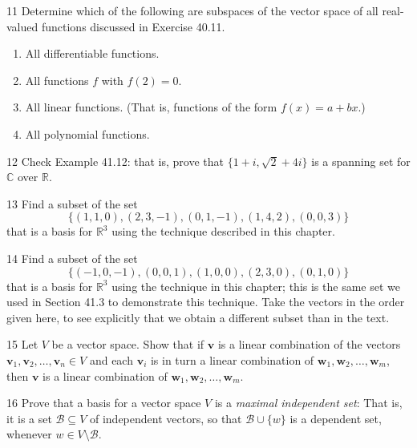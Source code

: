 \begin{problem}{11}
    Determine which of the following are subspaces of the vector space of all real-valued
    functions discussed in Exercise 40.11.
    \begin{enumerate}
        \item[(a)] All differentiable functions.
        \item[(b)] All functions $f$ with $f(2) = 0$.
        \item[(c)] All linear functions. (That is, functions of the form $f(x) = a + bx$.)
        \item[(d)] All polynomial functions.
    \end{enumerate}
\end{problem}
\unsolved

\begin{problem}{12}
    Check Example 41.12: that is, prove that $\{1 + i, \sqrt{2} + 4i\}$ is a spanning set
    for $\mathbb{C}$ over $\mathbb{R}$.
\end{problem}
\unsolved

\begin{problem}{13}
    Find a subset of the set
    \[\{(1, 1, 0), (2, 3, -1), (0, 1, -1), (1, 4, 2), (0, 0, 3)\}\]
    that is a basis for $\mathbb{R}^3$ using the technique described in this chapter.
\end{problem}
\unsolved

\begin{problem}{14}
    Find a subset of the set
    \[\{(-1, 0, -1), (0, 0, 1), (1, 0, 0), (2, 3, 0), (0, 1, 0)\}\]
    that is a basis for $\mathbb{R}^3$ using the technique in this chapter; this is the same
    set we used in Section 41.3 to demonstrate this technique. Take the vectors in the
    order given here, to see explicitly that we obtain a different subset than in the text.
\end{problem}
\unsolved

\begin{problem}{15}
    Let $V$ be a vector space. Show that if $\mathbf{v}$ is a linear combination of the
    vectors $\mathbf{v}_1, \mathbf{v}_2, \ldots, \mathbf{v}_n \in V$ and each
    $\mathbf{v}_i$ is in turn a linear combination of
    $\mathbf{w}_1, \mathbf{w}_2, \ldots, \mathbf{w}_m$, then $\mathbf{v}$ is a linear
    combination of $\mathbf{w}_1, \mathbf{w}_2, \ldots, \mathbf{w}_m$.
\end{problem}
\unsolved

\begin{problem}{16}
    Prove that a basis for a vector space $V$ is a \emph{maximal independent set}: That
    is, it is a set $\mathcal{B} \subseteq V$ of independent vectors, so that
    $\mathcal{B} \cup \{w\}$ is a dependent set, whenever $w \in V \setminus \mathcal{B}$.
\end{problem}
\unsolved

